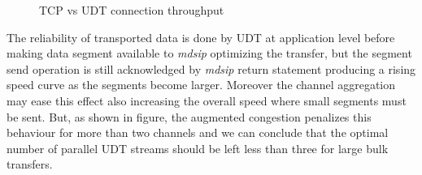 \documentclass[10pt,a4paper]{article}
\begin{document}
\begin{figure}[ht]
\centerline{
}
\caption[]
{ TCP vs UDT connection throughput }
\label{fig:size}
\end{figure}

The reliability of transported data is done by UDT at application level before making data segment available to \emph{mdsip} optimizing the transfer, but the segment send operation is still acknowledged by \emph{mdsip} return statement producing a rising speed curve as the segments become larger.
Moreover the channel aggregation may ease this effect also increasing the overall speed where small segments must be sent.
But, as shown in figure, the augmented congestion penalizes this behaviour for more than two channels and we can conclude that the optimal number of parallel UDT streams should be left less than three for large bulk transfers.
\end{document}
